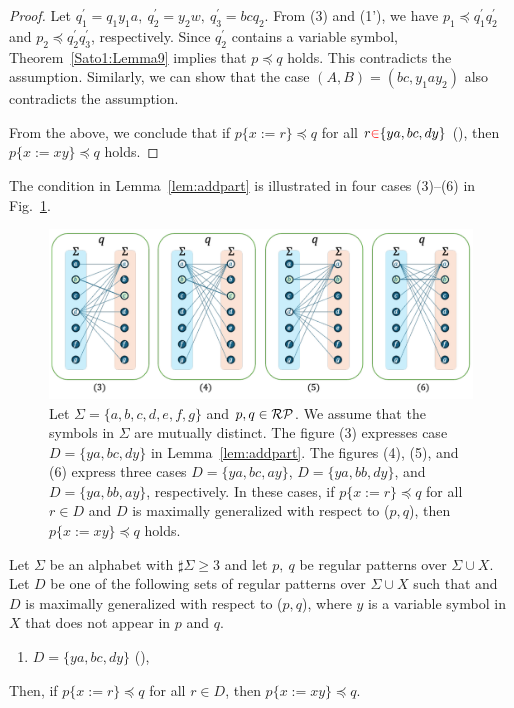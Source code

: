 \begin{proof}
  Let $q^{\prime}_{1}=q_{1}y_{1}a,~q^{\prime}_{2}=y_{2}w,~q^{\prime}_{3}=bcq_{2}$. From (3) and (1'), we have $p_{1} \preceq q^{\prime}_{1}q^{\prime}_{2}$ and $p_{2} \preceq q^{\prime}_{2}q^{\prime}_{3}$, respectively.
  Since $q_{2}^{\prime}$ contains a variable symbol, Theorem~\ref{Sato1:Lemma9} implies that $p \preceq q$ holds.
  This contradicts the assumption.
  Similarly, we can show that the case $(A, B) = (bc, y_{1}ay_{2})$ also contradicts the assumption.
  
  \smallskip
  
  From the above, we conclude that if $p \{ x := r \} \preceq q$ for all $r {\color{red}\in}  \{ ya, bc, dy \}$ (\TheConditionA), then $p \{ x := xy \} \preceq q$ holds.
  \end{proof}

  The condition in Lemma~\ref{lem:addpart} is illustrated in four cases (3)--(6) in Fig.~\ref{fig:lem5bigraph}.

  \begin{figure}[t]
    \begin{center}
      \includegraphics[scale=0.525]{figs/lem5bigraph.pdf}
      \caption{Let $\Sigma=\{a,b,c,d,e,f,g\}$ and $p,q \in \mathcal{RP}$. We assume that the symbols in $\Sigma$ are mutually distinct. The figure (3) expresses case $D = \{ ya, bc, dy \}$ in Lemma~\ref{lem:addpart}.
      The figures (4), (5), and (6) express three cases $D = \{ ya, bc, ay \}$, $D = \{ ya, bb, dy \}$, and $D = \{ ya, bb, ay \}$, respectively.
      In these cases, if $p \{ x := r \} \preceq q$ for all $r \in D$ and $D$ is maximally generalized {\color{red}with respect to} ($p,q$), then $p \{ x := xy \} \preceq q$ holds.}\label{fig:lem5bigraph}
    \end{center}
  \end{figure}


\begin{lem}\label{lem:oneside_i}
Let $\Sigma$ be an alphabet with $\sharp\Sigma \ge 3$ and let $p,~q$ be regular patterns {\color{red}over} $\Sigma\cup X$.
Let $D$ be one of the following sets of regular patterns {\color{red}over} $\Sigma\cup X$
{\color{red} such that and $D$ is maximally generalized {\color{red}with respect to} ($p,q$)}, where $y$ is a variable symbol in $X$ that does not appear in $p$ and $q$.
\begin{enumerate}
\item[] $D=\{ ya, bc, dy \}$ (\TheConditionB),
\end{enumerate}
Then, if $p \{ x := r \} \preceq q$ for all $r \in D$, then $p \{ x := xy \} \preceq q$.
\end{lem}

